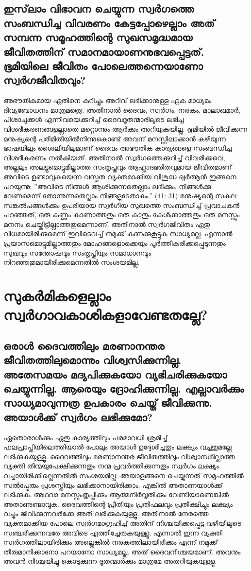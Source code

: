  \section{ഇസ്‌ലാം വിഭാവന ചെയ്യുന്ന സ്വര്‍ഗത്തെ സംബന്ധിച്ച വിവരണം കേട്ടപ്പോഴെല്ലാം അത് സമ്പന്ന സമൂഹത്തിന്റെ സുഖസമൃദ്ധമായ ജീവിതത്തിന് സമാനമായാണനുഭവപ്പെട്ടത്. ഭൂമിയിലെ ജീവിതം പോലെത്തന്നെയാണോ സ്വര്‍ഗജീവിതവും?}
 അഭൗതികമായ ഏതിനെ കുറിച്ചും അറിവ് ലഭിക്കാനുള്ള ഏക മാധ്യമം ദിവ്യബോധനം മാത്രമത്രെ. അതിനാല്‍ ദൈവം, സ്വര്‍ഗം, നരകം, മാലാഖമാര്‍, പിശാചുക്കള്‍ എന്നിവയെക്കുറിച്ച് ദൈവദൂതന്മാരിലൂടെ ലഭിച്ച വിശദീകരണങ്ങളല്ലാതെ മറ്റൊന്നും ആര്‍ക്കും അറിയുകയില്ല. ഭൂമിയില്‍ ജീവിക്കുന്ന മനുഷ്യന്റെ പരിമിതിയില്‍നിന്നുകൊണ്ട് അവന് മനസ്സിലാക്കാന്‍ കഴിയുന്ന ഭാഷയിലും ശൈലിയിലുമാണ് ദൈവം അഭൗതിക കാര്യങ്ങളെ സംബന്ധിച്ച വിശദീകരണം നല്‍കിയത്. അതിനാല്‍ സ്വര്‍ഗത്തെക്കുറിച്ച് വിവരിക്കവെ, അല്ലലും അലട്ടുമൊട്ടുമില്ലാത്ത സംതൃപ്തവും ആഹ്ലാദഭരിതവുമായ ജീവിതമാണ് അവിടെ ഉണ്ടാവുകയെന്ന വസ്തുത വ്യക്തമാക്കിയ വിശുദ്ധ ഖുര്‍ആന്‍ ഇങ്ങനെ പറയുന്നു: ''അവിടെ നിങ്ങള്‍ ആശിക്കുന്നതെല്ലാം ലഭിക്കും. നിങ്ങള്‍ക്കു വേണമെന്ന് തോന്നുന്നതെല്ലാം നിങ്ങളുടേതാകും.'' (41: 31)
മനുഷ്യന്റെ സകല സങ്കല്‍പങ്ങള്‍ക്കും ഉപരിയായ സ്വര്‍ഗീയ സുഖത്തെ സംബന്ധിച്ച് പ്രവാചകന്‍ പറഞ്ഞത്, ഒരു കണ്ണും കാണാത്തതും ഒരു കാതും കേള്‍ക്കാത്തതും ഒരു മനസ്സും മനനം ചെയ്തിട്ടില്ലാത്തതുമെന്നാണ്. അതിനാല്‍ സ്വര്‍ഗജീവിതം ഏതു വിധമായിരിക്കുമെന്ന് ഇവിടെവച്ച് നമുക്ക് കണക്കുകൂട്ടുക സാധ്യമല്ല. എന്നാല്‍ പ്രയാസമൊട്ടുമില്ലാത്തതും മോഹങ്ങളൊക്കെയും പൂര്‍ത്തീകരിക്കപ്പെടുന്നതും സുഖവും സന്തോഷവും സംതൃപ്തിയും സമാധാനവും നിറഞ്ഞതുമായിരിക്കുമെന്നതില്‍ സംശയമില്ല.
\chapter{സുകര്‍മികളെല്ലാം സ്വര്‍ഗാവകാശികളാവേണ്ടതല്ലേ? }
 \section{ ഒരാള്‍ ദൈവത്തിലും മരണാനന്തര ജീവിതത്തിലുമൊന്നും വിശ്വസിക്കുന്നില്ല. അതേസമയം മദ്യപിക്കുകയോ വ്യഭിചരിക്കുകയോ ചെയ്യുന്നില്ല. ആരെയും ദ്രോഹിക്കുന്നില്ല. എല്ലാവര്‍ക്കും സാധ്യമാവുന്നത്ര ഉപകാരം ചെയ്ത് ജീവിക്കുന്നു. അയാള്‍ക്ക് സ്വര്‍ഗം ലഭിക്കുമോ?}
 ഏതൊരാള്‍ക്കും ഏതു കാര്യത്തിലും പരമാവധി ശ്രമിച്ച് ഫലപ്രാപ്തിയിലെത്തിയാല്‍ പോലും അയാള്‍ ഉദ്ദേശിച്ചതും ലക്ഷ്യം വച്ചതുമല്ലേ ലഭിക്കുകയുള്ളൂ. ദൈവത്തിലും മരണാനന്തര ജീവിതത്തിലും വിശ്വാസമില്ലാത്ത വ്യക്തി തിന്മയുപേക്ഷിക്കുന്നതും നന്മ പ്രവര്‍ത്തിക്കുന്നതും സ്വര്‍ഗം ലക്ഷ്യം വച്ചായിരിക്കില്ലെന്നതില്‍ സംശയമില്ല. അയാളങ്ങനെ ചെയ്യുന്നത് സമൂഹത്തില്‍ സല്‍പ്പേരും പ്രശസ്തിയും ലഭിക്കാനായിരിക്കാം. എങ്കില്‍ അതാണയാള്‍ക്ക് ലഭിക്കുക. അഥവാ മനസ്സംതൃപ്തിക്കും ആത്മനിര്‍വൃതിക്കും വേണ്ടിയാണെങ്കില്‍ അതാണുണ്ടാവുക. ദൈവത്തിന്റെ പ്രീതിയും പ്രതിഫലവും പ്രതീക്ഷിച്ചും ലക്ഷ്യം വച്ചും ജീവിക്കുന്നവര്‍ക്കേ അത് ലഭിക്കുകയുള്ളൂ. അതിനാല്‍ നേരത്തെ വ്യക്തമാക്കിയ പോലെ സ്വര്‍ഗമാഗ്രഹിച്ച് അതിന് നിശ്ചയിക്കപ്പെട്ട വഴിയിലൂടെ സഞ്ചരിക്കുന്നവരേ അവിടെ എത്തിച്ചേരുകയുള്ളൂ. എന്നാല്‍ ഇന്ന വ്യക്തി സ്വര്‍ഗത്തിലായിരിക്കും അല്ലെങ്കില്‍ നരകത്തിലായിരിക്കും എന്ന് നമുക്ക് തീരുമാനിക്കാനോ പറയാനോ സാധ്യമല്ല. അത് ദൈവനിശ്ചയമാണ്. അവനും അവന്‍ നിശ്ചയിച്ചു കൊടുക്കുന്ന ദൂതന്മാര്‍ക്കും മാത്രമേ അതറിയുകയുള്ളൂ.
